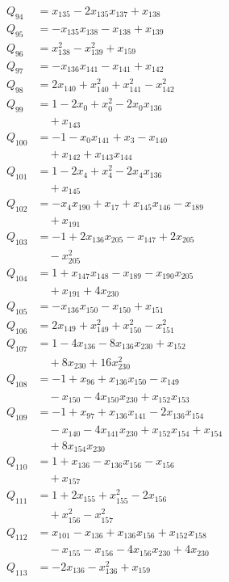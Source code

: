 \begin{align*}
Q_{94}&=x_{135}-2x_{135}x_{137}+x_{138}\\
Q_{95}&=-x_{135}x_{138}-x_{138}+x_{139}\\
Q_{96}&=x_{138}^{2}-x_{139}^{2}+x_{159}\\
Q_{97}&=-x_{136}x_{141}-x_{141}+x_{142}\\
Q_{98}&=2x_{140}+x_{140}^{2}+x_{141}^{2}-x_{142}^{2}\\
Q_{99}&=1-2x_{0}+x_{0}^{2}-2x_{0}x_{136}\\
&\quad +x_{143}\\
Q_{100}&=-1-x_{0}x_{141}+x_{3}-x_{140}\\
&\quad +x_{142}+x_{143}x_{144}\\
Q_{101}&=1-2x_{4}+x_{4}^{2}-2x_{4}x_{136}\\
&\quad +x_{145}\\
Q_{102}&=-x_{4}x_{190}+x_{17}+x_{145}x_{146}-x_{189}\\
&\quad +x_{191}\\
Q_{103}&=-1+2x_{136}x_{205}-x_{147}+2x_{205}\\
&\quad -x_{205}^{2}\\
Q_{104}&=1+x_{147}x_{148}-x_{189}-x_{190}x_{205}\\
&\quad +x_{191}+4x_{230}\\
Q_{105}&=-x_{136}x_{150}-x_{150}+x_{151}\\
Q_{106}&=2x_{149}+x_{149}^{2}+x_{150}^{2}-x_{151}^{2}\\
Q_{107}&=1-4x_{136}-8x_{136}x_{230}+x_{152}\\
&\quad +8x_{230}+16x_{230}^{2}\\
Q_{108}&=-1+x_{96}+x_{136}x_{150}-x_{149}\\
&\quad -x_{150}-4x_{150}x_{230}+x_{152}x_{153}\\
Q_{109}&=-1+x_{97}+x_{136}x_{141}-2x_{136}x_{154}\\
&\quad -x_{140}-4x_{141}x_{230}+x_{152}x_{154}+x_{154}\\
&\quad +8x_{154}x_{230}\\
Q_{110}&=1+x_{136}-x_{136}x_{156}-x_{156}\\
&\quad +x_{157}\\
Q_{111}&=1+2x_{155}+x_{155}^{2}-2x_{156}\\
&\quad +x_{156}^{2}-x_{157}^{2}\\
Q_{112}&=x_{101}-x_{136}+x_{136}x_{156}+x_{152}x_{158}\\
&\quad -x_{155}-x_{156}-4x_{156}x_{230}+4x_{230}\\
Q_{113}&=-2x_{136}-x_{136}^{2}+x_{159}\\

\end{align*}
